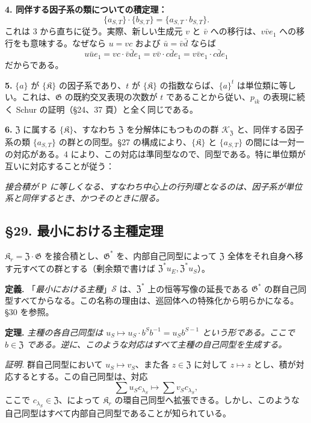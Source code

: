 \noindent\textbf{4. 同伴する因子系の類についての積定理：}
\[
\{a_{S,T}\}\cdot\{b_{S,T}\}=\{a_{S,T}\cdot b_{S,T}\}.
\]
これは 3 から直ちに従う。実際、新しい生成元 \(v\) と \(\bar v\) への移行は、\(v\bar ve_1\) への移行をも意味する。なぜなら \(u=vc\) および \(\bar u=\bar v\bar d\) ならば
\[
u\bar ue_1=vc\cdot\bar v\bar de_1
=v\bar v\cdot c\bar de_1
=v\bar ve_1\cdot c\bar de_1
\]
だからである。

\noindent\textbf{5.} \(\{a\}\) が \(\{\mathfrak K\}\) の因子系であり、\(t\) が \(\{\mathfrak K\}\) の指数ならば、\(\{a\}^t\) は単位類に等しい。これは、\(\mathfrak G\) の既約交叉表現の次数が \(t\) であることから従い、\(p_{ik}\) の表現に続く Schur の証明（\S 24、37 頁）と全く同じである。

\noindent\textbf{6.} \(\mathfrak Z\) に属する \(\{\mathfrak K\}\)、すなわち \(\mathfrak Z\) を分解体にもつものの群 \(\mathscr K_{\mathfrak Z}\) と、同伴する因子系の類 \(\{a_{S,T}\}\) の群との同型。\S 27 の構成により、\(\{\mathfrak K\}\) と \(\{a_{S,T}\}\) の間には一対一の対応がある。4 により、この対応は準同型なので、同型である。特に単位類が互いに対応することが従う：

\noindent\emph{接合積が \(\mathsf P\) に等しくなる、すなわち中心上の行列環となるのは、因子系が単位系と同伴するとき、かつそのときに限る。}

\subsection*{\S 29. 最小における主種定理}\label{hauptgeschlechtssatz-im-minimalen}

\(\mathfrak K_r=\mathfrak Z\cdot\mathfrak G\) を接合積とし、\(\mathfrak G^*\) を、内部自己同型によって \(\mathfrak Z\) 全体をそれ自身へ移す元すべての群とする（剰余類で書けば \(\mathfrak Z^*u_E,\mathfrak Z^*u_S\)）。

\noindent\textbf{定義.} 「\emph{最小における主種}」\(\mathscr S\) は、\(\mathfrak Z^*\) 上の恒等写像の延長である \(\mathfrak G^*\) の群自己同型すべてからなる。この名称の理由は、巡回体への特殊化から明らかになる。\S 30 を参照。

\noindent\textbf{定理.} \emph{主種の各自己同型は \(u_S\mapsto u_S\cdot b^Sb^{-1}=u_Sb^{S-1}\) という形である。ここで \(b\in\mathfrak Z\) である。逆に、このような対応はすべて主種の自己同型を生成する。}

\noindent\emph{証明.} 群自己同型において \(u_S\mapsto v_S\)、また各 \(z\in\mathfrak Z\) に対して \(z\mapsto z\) とし、積が対応するとする。この自己同型は、対応
\[
\sum u_Sc_{\lambda_S}\mapsto\sum v_Sc_{\lambda_S},
\]
ここで \(c_{\lambda_S}\in\mathfrak Z\)、によって \(\mathfrak K_r\) の環自己同型へ拡張できる。しかし、このような自己同型はすべて内部自己同型であることが知られている。

